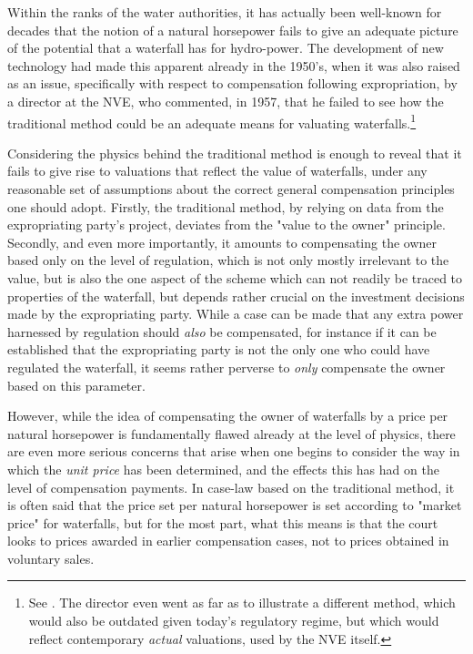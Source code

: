 Within the ranks of the water authorities, it has actually been well-known for decades that the notion of a natural horsepower fails to give an adequate picture of the potential that a waterfall has for hydro-power. The development of new technology had made this apparent already in the 1950's, when it was also raised as an issue, specifically with respect to compensation following expropriation, by a director at the NVE, who commented, in 1957, that he failed to see how the traditional method could be an adequate means for valuating waterfalls.\footnote{See \cite{....}. The director even went as far as to illustrate a different method, which would also be outdated given today's regulatory regime, but which would reflect contemporary \emph{actual} valuations, used by the NVE itself.}

Considering the physics behind the traditional method is enough to reveal that it fails to give rise to valuations that reflect the value of waterfalls, under any reasonable set of assumptions about the correct general compensation principles one should adopt. Firstly, the traditional method, by relying on data from the expropriating party's project, deviates from the "value to the owner" principle. Secondly, and even more importantly, it amounts to compensating the owner based only on the level of regulation, which is not only mostly irrelevant to the value, but is also the one aspect of the scheme which can not readily be traced to properties of the waterfall, but depends rather crucial on the investment decisions made by the expropriating party. While a case can be made that any extra power harnessed by regulation should \emph{also} be compensated, for instance if it can be established that the expropriating party is not the only one who could have regulated the waterfall, it seems rather perverse to \emph{only} compensate the owner based on this parameter.

However, while the idea of compensating the owner of waterfalls by a price per natural horsepower is fundamentally flawed already at the level of physics, there are even more serious concerns that arise when one begins to consider the way in which the \emph{unit price} has been determined, and the effects this has had on the level of compensation payments. In case-law based on the traditional method, it is often said that the price set per natural horsepower is set according to "market price" for waterfalls, but for the most part, what this means is that the court looks to prices awarded in earlier compensation cases, not to prices obtained in voluntary sales.

